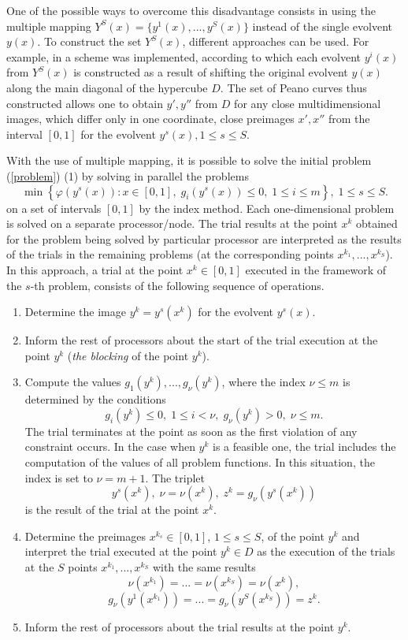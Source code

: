 \documentclass[smallextended]{svjour3}       %
\begin{document}
One of the possible ways to overcome this disadvantage consists in using the multiple mapping $Y^S(x)=\{ y^1 (x),...,y^S(x)\}$ instead of the single evolvent $y(x)$. To construct the set $Y^S(x)$, different approaches can be used. For example, in \cite{Strongin2000} a scheme was implemented, according to which each evolvent $y^i(x)$ from $Y^S(x)$ is constructed as a result of shifting the original evolvent $y(x)$ along the main diagonal of the hypercube $D$. The set of Peano curves thus constructed allows one to obtain $y', y''$ from $D$ for any close multidimensional images, which differ only in one coordinate, close preimages $x', x''$ from the interval $[0,1]$ for the evolvent $y^s(x), 1\leq s \leq S$.

With the use of multiple mapping, it is possible to solve the initial problem (\ref{problem}) (1) by solving in parallel the problems
\[
\min \left\{\varphi(y^s(x)): x \in [0,1], \; g_i(y^s(x))\leq 0, \; 1 \leq i \leq m\right\},\; 1\leq s \leq S.
\]
on a set of intervals $[0,1]$ by the index method. Each one-dimensional problem is solved on a separate processor/node. The trial results at the point $x^k$ obtained for the problem being solved by particular processor are interpreted as the results of the trials in the remaining problems (at the corresponding points $x^{k_1},...,x^{k_S}$). In this approach, a trial at the point $x^k \in [0,1]$ executed in the framework of the $s$-th problem, consists of the following sequence of operations.

\begin{enumerate}
	
	\item Determine the image $y^k=y^s(x^k)$ for the evolvent $y^s(x)$.
	
	\item Inform the rest of processors about the start of the trial execution at the point $y^k$ (\textit{the blocking} of the point $y^k$).
	
	\item Compute the values $g_1(y^k),...,g_\nu(y^k)$, where the index $\nu \leq m$ is determined by the conditions
	\[
		g_i(y^k)\leq 0, \; 1 \leq i < \nu, \; g_\nu(y^k)>0, \; \nu \leq m.
	\]
The trial terminates at the point as soon as the first violation of any constraint occurs. In the case when $y^k$ is a feasible one, the trial includes the computation of the values of all problem functions. In this situation, the index is set to $\nu=m+1$. The triplet
\[
y^s(x^k), \; \nu=\nu(x^k), \; z^k=g_\nu(y^s(x^k))
\]
is the result of the trial at the point $x^k$.

\item Determine the preimages $x^{k_s} \in [0,1]$, $1 \leq s \leq S$, of the point $y^k$ and interpret the trial executed at the point $y^k \in D$ as the execution of the trials at the $S$ points  $x^{k_1},...,x^{k_S}$ with the same results
\[
 \nu(x^{k_1}) = ... = \nu(x^{k_S}) = \nu(x^k),
\]
\[
 g_\nu(y^1(x^{k_1})) = ... = g_\nu(y^S(x^{k_S})) = z^k.
\]

\item Inform the rest of processors about the trial results at the point $y^k$.
	
\end{enumerate}
\end{document}
